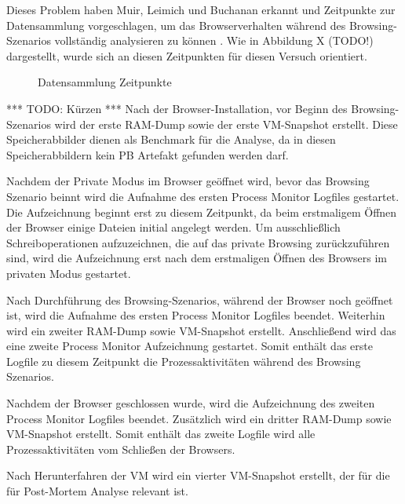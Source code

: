 Dieses Problem haben Muir, Leimich und Buchanan erkannt und Zeitpunkte zur Datensammlung vorgeschlagen, um das Browserverhalten während des Browsing-Szenarios vollständig analysieren zu können \cite{Muir.2019}. Wie in Abbildung X (TODO!) dargestellt, wurde sich an diesen Zeitpunkten für diesen Versuch orientiert.
\begin{figure}[h!]
	\centering
	\small
	\centerline{\resizebox{\linewidth}{!}{}}
	\caption{Datensammlung Zeitpunkte}
	\label{fig:jes}
\end{figure}
*** TODO: Kürzen ***
Nach der Browser-Installation, vor Beginn des Browsing-Szenarios wird der erste RAM-Dump sowie der erste VM-Snapshot erstellt.
Diese Speicherabbilder dienen als Benchmark für die Analyse, da in diesen Speicherabbildern kein PB Artefakt gefunden werden darf.

Nachdem der Private Modus im Browser geöffnet wird, bevor das Browsing Szenario beinnt wird die Aufnahme des ersten Process Monitor Logfiles gestartet.
Die Aufzeichnung beginnt erst zu diesem Zeitpunkt, da beim erstmaligem Öffnen der Browser einige Dateien initial angelegt werden. Um ausschließlich Schreiboperationen aufzuzeichnen, die auf das private Browsing zurückzuführen sind, wird die Aufzeichnung erst nach dem erstmaligen Öffnen des Browsers im privaten Modus gestartet.

Nach Durchführung des Browsing-Szenarios, während der Browser noch geöffnet ist, wird die Aufnahme des ersten Process Monitor Logfiles beendet. Weiterhin wird ein zweiter RAM-Dump sowie VM-Snapshot erstellt. Anschließend wird das eine zweite Process Monitor Aufzeichnung gestartet. 
Somit enthält das erste Logfile zu diesem Zeitpunkt die Prozessaktivitäten während des Browsing Szenarios. 

Nachdem der Browser geschlossen wurde, wird die Aufzeichnung des zweiten Process Monitor Logfiles beendet. Zusätzlich wird ein dritter RAM-Dump sowie  VM-Snapshot erstellt. Somit enthält das zweite Logfile wird alle Prozessaktivitäten vom Schließen der Browsers.

Nach Herunterfahren der VM wird ein vierter VM-Snapshot erstellt, der für die für Post-Mortem Analyse relevant ist.

